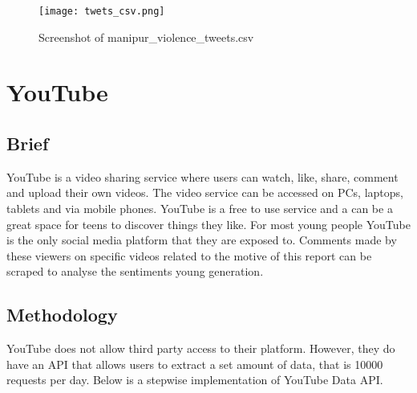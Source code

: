 \documentclass{report}
\begin{document}
\begin{figure}[h]
  \centering
  \texttt{[image: twets\_csv.png]}
  \caption{Screenshot of manipur\_violence\_tweets.csv}
  \label{fig:mage}
\end{figure}









\newpage
\vspace*{3pt}
\section{YouTube}
\subsection{Brief}
YouTube is a video sharing service where users can watch, like, share, comment and upload their own videos. The video service can be accessed on PCs, laptops, tablets and via mobile phones. YouTube is a free to use service and a can be a great space for teens to discover things they like. For most young people YouTube is the only social media platform that they are exposed to. Comments made by these viewers on specific videos related to the motive of this report can be scraped to analyse the  sentiments young generation. 
\subsection{Methodology}
YouTube does not allow third party access to their platform. However, they do have an API that allows users to extract a set amount of data, that is 10000 requests per day. Below is a stepwise implementation of YouTube Data API.
\end{document}
